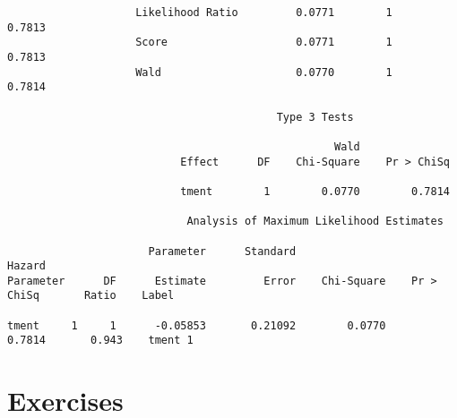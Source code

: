 \documentclass[
  letterpaper,
  DIV=11,
  numbers=noendperiod]{scrreprt}
\begin{document}
\begin{verbatim}
                    Likelihood Ratio         0.0771        1         0.7813
                    Score                    0.0771        1         0.7813
                    Wald                     0.0770        1         0.7814

                                          Type 3 Tests
 
                                                   Wald
                           Effect      DF    Chi-Square    Pr > ChiSq

                           tment        1        0.0770        0.7814

                            Analysis of Maximum Likelihood Estimates
 
                      Parameter      Standard                                  Hazard
Parameter      DF      Estimate         Error    Chi-Square    Pr > ChiSq       Ratio    Label

tment     1     1      -0.05853       0.21092        0.0770        0.7814       0.943    tment 1
\end{verbatim}

\hypertarget{exercises}{%
\section{Exercises}\label{exercises}}
\end{document}
